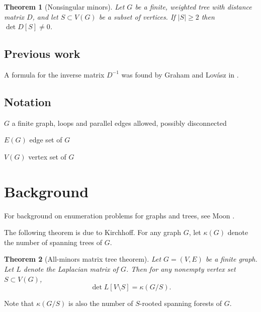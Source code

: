 \documentclass{amsart}
\newtheorem{thm}{Theorem}
\theoremstyle{definition}
\newcommand{\RR}{\mathbb{R}}
\newcommand{\cC}{\mathcal{C}}
\begin{document}
\begin{thm}[Nonsingular minors]
Let $G$ be a finite, weighted tree
with distance matrix $D$,
and let $S \subset V(G)$ be a subset of vertices.
If $|S|\geq 2$ then $\det D[S] \neq 0$.
\end{thm}

\subsection{Previous work} 
A formula for the inverse matrix $D^{-1}$ was found by Graham and Lov\'{a}sz in \cite{graham-lovasz}.

\subsection{Notation}


$G$ a finite graph, 
loops and parallel edges allowed,
possibly disconnected

$E(G)$ edge set of $G$

$V(G)$ vertex set of $G$





\section{Background}

For background on enumeration problems for graphs and trees, see Moon \cite{moon}.



The following theorem is due to Kirchhoff.
For any graph $G$, let $\kappa(G)$ denote the number of spanning trees of $G$.
\begin{thm}[All-minors matrix tree theorem]
Let $G = (V,E)$ be a finite graph.
Let $L$ denote the Laplacian matrix of $G$.
Then for any nonempty vertex set $S \subset V(G)$,
\begin{equation}
\det L[V \setminus S] = \kappa( G / S) .
\end{equation}
\end{thm}
Note that $\kappa(G/S)$ is also the number of $S$-rooted spanning forests of $G$.
\end{document}
